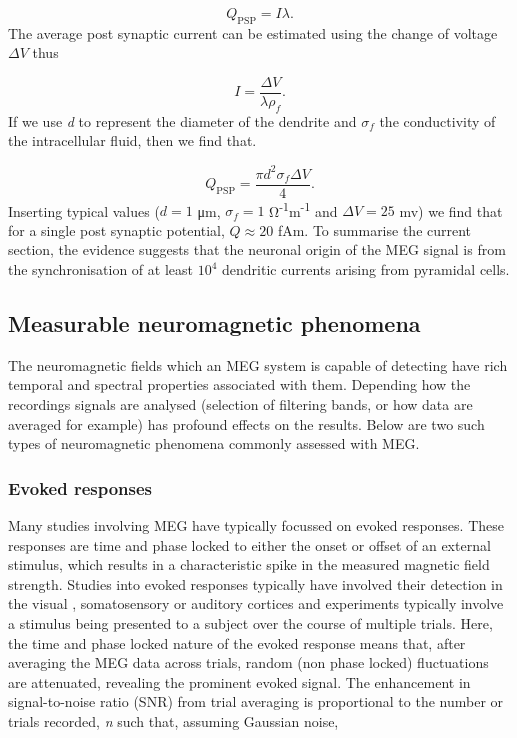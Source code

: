 \begin{equation}
Q_\text{PSP}=I\lambda.
\end{equation} The average post synaptic current can be estimated using the change of voltage $\Delta V$ thus

\begin{equation}
I = \frac{\Delta V}{\lambda\rho_f}.
\end{equation} If we use \textit{d} to represent the diameter of the dendrite and $\sigma_f$ the conductivity of the intracellular fluid, then we find that.

\begin{equation}
Q_\text{PSP}=\frac{\pi d^2\sigma_f \Delta V}{4}.
\end{equation} Inserting typical values ($d=1$ μm, $\sigma_f=1$ Ω\textsuperscript{-1}m\textsuperscript{-1} and $\Delta V=25$ mv) we find that for a single post synaptic potential, $Q\approx20$ fAm. To summarise the current section, the evidence suggests that the neuronal origin of the MEG signal is from the synchronisation of at least $10^4$ dendritic currents arising from pyramidal cells. 

\subsection{Measurable neuromagnetic phenomena}
The neuromagnetic fields which an MEG system is capable of detecting have rich temporal and spectral properties associated with them. Depending how the recordings signals are analysed (selection of filtering bands, or how data are averaged for example) has profound effects on the results. Below are two such types of neuromagnetic phenomena commonly assessed with MEG.

\subsubsection{Evoked responses}
Many studies involving MEG have typically focussed on evoked responses. These responses are time and phase locked to either the onset or offset of an external stimulus, which results in a characteristic spike in the measured magnetic field strength. Studies into evoked responses typically have involved their detection in the visual \citep{Ahlfors1992}, somatosensory \citep{Hari1990} or auditory cortices \citep{Makela1990} and experiments typically involve a stimulus being presented to a subject over the course of multiple trials. Here, the time and phase locked nature of the evoked response means that, after averaging the MEG data across trials, random (non phase locked) fluctuations are attenuated, revealing the prominent evoked signal. The enhancement in signal-to-noise ratio (SNR) from trial averaging is proportional to the number or trials recorded, \textit{n} such that, assuming Gaussian noise,


